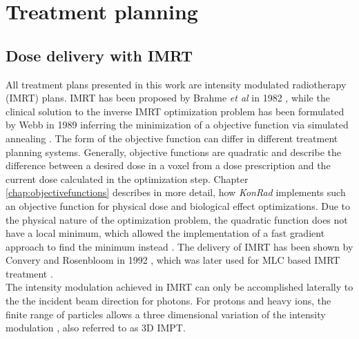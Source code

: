 \section{Treatment planning}
\subsection{Dose delivery with IMRT}
All treatment plans presented in this work are intensity modulated radiotherapy (IMRT) plans. IMRT has been proposed by Brahme \textit{et al} in 1982 \cite{pmid7146095}, while the clinical solution to the inverse IMRT optimization problem has been formulated by Webb in 1989 \cite{pmid2682694} inferring the minimization of a objective function via simulated annealing \cite{pmid16790913}. The form of the objective function can differ in different treatment planning systems. Generally, objective functions are quadratic and describe the difference between a desired dose in a voxel from a dose prescription and the current dose calculated in the optimization step. Chapter \ref{chap:objectivefunctions} describes in more detail, how \textit{KonRad} implements such an objective function for physical dose and biological effect optimizations. Due to the physical nature of the optimization problem, the quadratic function does not have a local minimum, which allowed the implementation of a fast gradient approach to find the minimum instead \cite{pmid2243845}. The delivery of IMRT has been shown by Convery and Rosenbloom in 1992 \cite{Convery_Rosebloom_1992}, which was later used for MLC based IMRT treatment \cite{pmid8690638}. \\The intensity modulation achieved in IMRT can only be accomplished laterally to the the incident beam direction for photons. For protons and heavy ions, the finite range of particles allows a three dimensional variation of the intensity modulation \cite{pmid10071883}, also referred to as 3D IMPT.
